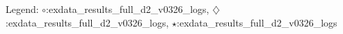 Legend: {\color{CornflowerBlue}$\circ$}:exdata\validation\_results\bbob\_full\_d2\_v0326\coco\_logs\cmaes, {{}$\diamondsuit$}:exdata\validation\_results\bbob\_full\_d2\_v0326\coco\_logs\ngopt, {\color{Green}$\star$}:exdata\validation\_results\bbob\_full\_d2\_v0326\coco\_logs\stacked